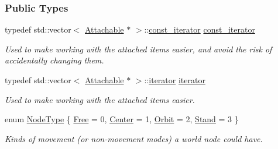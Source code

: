 \subsubsection*{Public Types}
\begin{DoxyCompactItemize}
\item 
\hypertarget{classMezzanine_1_1WorldNode_aa7097dbbb9b0920f6d9952e3315227fa}{
typedef std::vector$<$ \hyperlink{classMezzanine_1_1Attachable}{Attachable} $\ast$ $>$::\hyperlink{classMezzanine_1_1WorldNode_aa7097dbbb9b0920f6d9952e3315227fa}{const\_\-iterator} \hyperlink{classMezzanine_1_1WorldNode_aa7097dbbb9b0920f6d9952e3315227fa}{const\_\-iterator}}
\label{classMezzanine_1_1WorldNode_aa7097dbbb9b0920f6d9952e3315227fa}

\begin{DoxyCompactList}\small\item\em Used to make working with the attached items easier, and avoid the risk of accidentally changing them. \item\end{DoxyCompactList}\item 
\hypertarget{classMezzanine_1_1WorldNode_a2057d95435b0675936fe71ccb047f261}{
typedef std::vector$<$ \hyperlink{classMezzanine_1_1Attachable}{Attachable} $\ast$ $>$::\hyperlink{classMezzanine_1_1WorldNode_a2057d95435b0675936fe71ccb047f261}{iterator} \hyperlink{classMezzanine_1_1WorldNode_a2057d95435b0675936fe71ccb047f261}{iterator}}
\label{classMezzanine_1_1WorldNode_a2057d95435b0675936fe71ccb047f261}

\begin{DoxyCompactList}\small\item\em Used to make working with the attached items easier. \item\end{DoxyCompactList}\item 
enum \hyperlink{classMezzanine_1_1WorldNode_a7b41cfe149e688905e56fb395d6a2493}{NodeType} \{ \hyperlink{classMezzanine_1_1WorldNode_a7b41cfe149e688905e56fb395d6a2493ab728930f8f7ab3d8f07bdcdde49ebf51}{Free} =  0, 
\hyperlink{classMezzanine_1_1WorldNode_a7b41cfe149e688905e56fb395d6a2493a6c2339a568e17d9e4cc4532fc64f858b}{Center} =  1, 
\hyperlink{classMezzanine_1_1WorldNode_a7b41cfe149e688905e56fb395d6a2493a021c60f772db0c6cc856300903f38646}{Orbit} =  2, 
\hyperlink{classMezzanine_1_1WorldNode_a7b41cfe149e688905e56fb395d6a2493ac37c7343618aecc1d1aa060024ddcf93}{Stand} =  3
 \}
\begin{DoxyCompactList}\small\item\em Kinds of movement (or non-\/movement modes) a world node could have. \item\end{DoxyCompactList}\end{DoxyCompactItemize}
